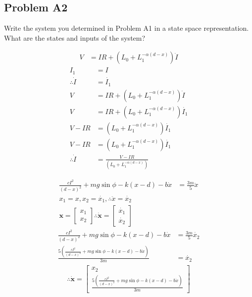 \subsection{Problem A2}
    Write the system you determined in Problem A1 in a state space representation. What are the states and inputs of the system?

    \begin{align}
        V &= IR + (L_{0} + L_{1} ^{- \alpha (d - x)})\dot{I}
    \end{align}
    \begin{align}
        I_1 &= I\nonumber\\
        \therefore \dot{I} &= \dot{I_1}\nonumber\\
        V &= IR + (L_{0} + L_{1} ^{- \alpha (d - x)})\dot{I}\nonumber\\
        V &= IR + (L_{0} + L_{1} ^{- \alpha (d - x)})\dot{I_1}\nonumber\\
        V - IR &= (L_{0} + L_{1} ^{- \alpha (d - x)})\dot{I_1}\nonumber\\
        V - IR &= (L_{0} + L_{1} ^{- \alpha (d - x)})\dot{I_1}\nonumber\\
        \therefore
        \dot{I} &= \frac{V - IR}{(L_{0} + L_{1} ^{- \alpha (d - x)})}
    \end{align}


    \begin{align}
        \frac{c I^2}{(d - x)^2} + mg \sin{\phi} - k(x -d) - b \dot{x} &= \frac{3m}{5} \ddot{x} \\
        x_1 = x, x_2 = \dot{x_1}, \therefore \ddot{x} = \dot{x_2}\nonumber\\
        \bm{x} =
        \begin{bmatrix}
            x_1
            \\
            x_2
        \end{bmatrix}
        \therefore \bm{\dot{x}} =
        \begin{bmatrix}
            \dot{x_1}
            \\
            \dot{x_2}
        \end{bmatrix} \nonumber
    \end{align}
    \begin{align}
        \frac{c I^2}{(d - x)^2} + mg \sin{\phi} - k(x -d) - b \dot{x} &= \frac{3m}{5} \dot{x_2} \nonumber\\
        \frac{5(\frac{c I^2}{(d - x)^2} + mg \sin{\phi} - k(x -d) - b \dot{x})}{3m} &= \dot{x_2} \nonumber
    \end{align}
    \begin{align}
        \therefore \bm{\dot{x}} =
        \begin{bmatrix}
            x_2
            \\
            \frac{5(\frac{c I^2}{(d - x)^2} + mg \sin{\phi} - k(x -d) - b \dot{x})}{3m}
        \end{bmatrix}
    \end{align}




